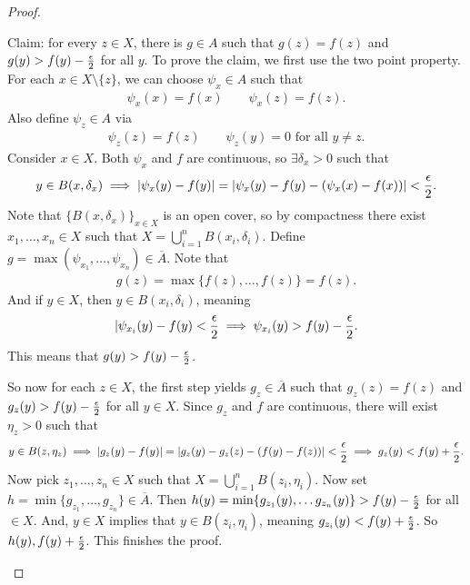 \documentclass{report}
\begin{document}
\begin{proof}
\begin{itemize}
        Claim: for every $z \in X$, there is $g \in A$ such that $g(z) = f(z)$ and $g(y) > f(y) - \frac{\epsilon}{2}$ for all $y$. To prove the claim, we first use the two point property. For each $x \in X \setminus \{z\}$, we can choose $\psi_x \in A$ such that 
        \begin{align*}
            \psi_x(x) = f(x) \quad \quad \psi_x(z) = f(z).
        \end{align*}
        Also define $\psi_z \in A$ via \begin{align*}
            \psi_z(z) = f(z) \quad \quad \psi_z(y) = 0 \text{ for all $y \neq z$}.
        \end{align*}
        Consider $x \in X$. Both $\psi_x$ and $f$ are continuous, so $\exists \delta_x > 0$ such that
        \begin{align*}
            y \in B(x, \delta_x) \implies |\psi_x(y) - f(y)| = |\psi_x(y) - f(y) - (\psi_x(x) - f(x))| < \frac{\epsilon}{2}.
        \end{align*}
        Note that $\{B(x, \delta_x)\}_{x\in X}$ is an open cover, so by compactness there exist $x_1 , \ldots, x_n \in X$ such that $X = \bigcup_{i=1}^n B(x_i, \delta_i)$. Define $g = \max (\psi_{x_1}, \ldots, \psi_{x_n}) \in \overline A$. Note that 
        \begin{align*}
            g(z) = \max\{f(z), \ldots, f(z)\} = f(z).
        \end{align*}
        And if $y \in X$, then $y \in B(x_i, \delta_i)$, meaning 
        \begin{align*}
            | \psi_{x_i}(y) - f(y) < \frac {\epsilon} 2 \implies \psi_{x_i}(y) > f(y) - \frac{\epsilon}{2}.
        \end{align*}
        This means that $g(y) > f(y) - \frac {\epsilon} 2$. 

        So now for each $z \in X$, the first step yields $g_z \in \overline A$ such that $g_z(z) = f(z)$ and $g_z(y) > f(y) - \frac {\epsilon} 2$ for all $y \in X$. Since $g_z$ and $f$ are continuous, there will exist $\eta_z > 0$ such that 
        \begin{align*}
            y \in B(z, \eta_z) \implies |g_z(y) - f(y)| = |g_z(y) - g_z(z) - (f(y) -f(z))| < \frac {\epsilon} 2 \implies g_z(y) < f(y) + \frac {\epsilon} 2.
        \end{align*}
        Now pick $z_1, \ldots, z_n \in X$ such that $X = \bigcup_{i=1}^n B(z_i, \eta_i)$. Now set $h = \min\{g_{z_1}, \ldots, g_{z_n}\} \in \overline A$. Then $h(y) = \min \{g_{z_1}(y), \ldots g_{z_n}(y)\} > f(y) - \frac {\epsilon} 2$ for all $ \in X$. And, $y \in X$ implies that $y \in B(z_i, \eta_i)$, meaning $g_{z_i}(y) < f(y) + \frac {\epsilon} 2$. So $h(y) , f(y) + \frac {\epsilon} 2$. This finishes the proof.
    \end{itemize}
\end{proof}
\end{document}
